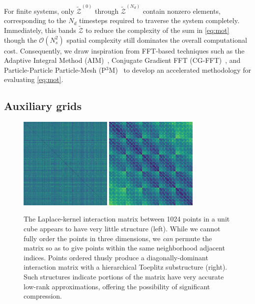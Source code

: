 For finite systems, only $\tilde{\mathcal{Z}}^{(0)}$ through $\tilde{\mathcal{Z}}^{(N_d)}$ contain nonzero elements, corresponding to the $N_d$ timesteps required to traverse the system completely.
Immediately, this bands $\tilde{\mathcal{Z}}$ to reduce the complexity of the sum in \cref{eq:mot} though the $\mathcal{O}(N_s^2)$ spatial complexity still dominates the overall computational cost.
Consequently, we draw inspiration from FFT-based techniques such as the Adaptive Integral Method (AIM)~\cite{AIM}, Conjugate Gradient FFT (CG-FFT)~\cite{CG-FFT}, and Particle-Particle Particle-Mesh (P$^3$M)~\cite{p cubed m} to develop an accelerated methodology for evaluating \cref{eq:mot}.

\subsection{Auxiliary grids}

\begin{figure}
  \centering
  \includegraphics[width=0.4\textwidth]{figures/dist_mat_unsorted}
  \hspace{1cm}
  \includegraphics[width=0.4\textwidth]{figures/dist_mat_sorted}
  \caption{\label{fig:matrix structure} The Laplace-kernel interaction matrix between 1024 points in a unit cube appears to have very little structure (left).
    While we cannot fully order the points in three dimensions, we \emph{can} permute the matrix so as to give points within the same neighborhood adjacent indices.
    Points ordered thusly produce a diagonally-dominant interaction matrix with a hierarchical Toeplitz substructure (right).
    Such structures indicate portions of the matrix have very accurate low-rank approximations, offering the possibility of significant compression.
  }
\end{figure}

